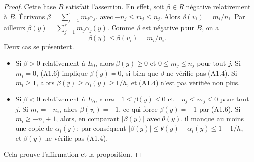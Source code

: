 \documentclass[11pt]{article}
\begin{document}
\begin{proof}
Cette base \(B\) satisfait l'assertion. En effet, soit \(\beta\in R\) négative relativement à
\(B\). Écrivons \(\beta=\sum_{j=1}^r m_j\alpha_j\), avec \(-n_j\le m_j\le n_j\). Alors
\(\beta(v_i)=m_i/n_i\). Par ailleurs \(\beta(y)=\sum_{j=1}^r m_j\alpha_j(y)\). Comme
\(\beta\) est négative pour \(B\), on a
\begin{equation}
  \beta(y)\le \beta(v_i)=m_i/n_i.
  \tag{A1.6}
\end{equation}
Deux cas se présentent.

\begin{itemize}[leftmargin=*]
\item Si \(\beta>0\) relativement à \(B_0\), alors \(\beta(y)\ge0\) et
\(0\le m_j\le n_j\) pour tout \(j\). Si \(m_i=0\), (A1.6) implique \(\beta(y)=0\), si bien que
\(\beta\) ne vérifie pas (A1.4). Si \(m_i\ge1\), alors
\(\beta(y)\ge\alpha_i(y)\ge1/h\), et (A1.4) n'est pas vérifiée non plus.

\item Si \(\beta<0\) relativement à \(B_0\), alors \(-1\le\beta(y)\le0\) et
\(-n_j\le m_j\le0\) pour tout \(j\). Si \(m_i=-n_i\), alors \(\beta(v_i)=-1\), ce qui force
\(\beta(y)=-1\) par (A1.6). Si \(m_i\ge -n_i+1\), alors, en comparant \(|\beta(y)|\) avec
\(\theta(y)\), il manque au moins une copie de \(\alpha_i(y)\); par conséquent
\(|\beta(y)|\le\theta(y)-\alpha_i(y)\le1-1/h\), et \(\beta(y)\) ne vérifie pas (A1.4).
\end{itemize}

Cela prouve l'affirmation et la proposition.
\end{proof}
\end{document}
